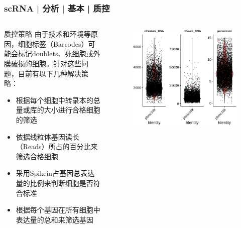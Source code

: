 \documentclass[11pt]{ctexbeamer}
\begin{document}
\begin{frame}
  \frametitle{scRNA | 分析 | 基本 | 质控}
  \begin{columns}
  \begin{block}{质控策略}
  	由于技术和环境等原因，细胞标签（Barcodes）可能会标记doublets、死细胞或外膜破损的细胞。针对这些问题，目前有以下几种解决策略：
  	\begin{itemize}
  	\item 根据每个细胞中转录本的总量或库的大小进行合格细胞的筛选
  	\item 依据线粒体基因读长（Reads）所占的百分比来筛选合格细胞
  	\item 采用Spikein占基因总表达量的比例来判断细胞是否符合标准
  	\item 根据每个基因在所有细胞中表达量的总和来筛选基因
  \end{itemize}
  \end{block}
  \begin{figure}
	\includegraphics[width=1.1\textwidth]{scRNA_qc_01.png}
\end{figure}
\end{columns}
\end{frame}
\end{document}
